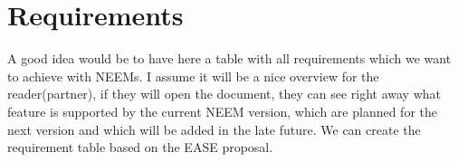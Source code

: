 \chapter{Requirements}
A good idea would be to have here a table with all requirements which we want to achieve with NEEMs.
I assume it will be a nice overview for the reader(partner), if they will open the document, they can see right away what feature is supported by the current NEEM version, which are planned for the next version and which will be added in the late future. We can create the requirement table based on the EASE proposal.
